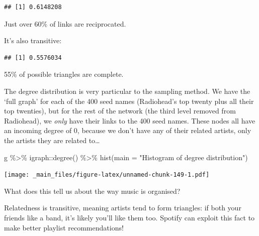 \documentclass[
]{book}
\newenvironment{Shaded}{\begin{snugshade}}{\end{snugshade}}
\newcommand{\AttributeTok}[1]{\textcolor[rgb]{0.77,0.63,0.00}{#1}}
\newcommand{\FunctionTok}[1]{\textcolor[rgb]{0.00,0.00,0.00}{#1}}
\newcommand{\NormalTok}[1]{#1}
\newcommand{\SpecialCharTok}[1]{\textcolor[rgb]{0.00,0.00,0.00}{#1}}
\newcommand{\StringTok}[1]{\textcolor[rgb]{0.31,0.60,0.02}{#1}}
\begin{document}
\begin{verbatim}
## [1] 0.6148208
\end{verbatim}

Just over 60\% of links are reciprocated.

It's also transitive:

\begin{Shaded}
\end{Shaded}

\begin{verbatim}
## [1] 0.5576034
\end{verbatim}

55\% of possible triangles are complete.

The degree distribution is very particular to the sampling method. We have the `full graph' for each of the 400 seed names (Radiohead's top twenty plus all their top twenties), but for the rest of the network (the third level removed from Radiohead), we \emph{only} have their links to the 400 seed names. These nodes all have an incoming degree of 0, because we don't have any of their related artists, only the artists they are related to\ldots{}

\begin{Shaded}
\begin{Highlighting}[]
\NormalTok{g }\SpecialCharTok{\%\textgreater{}\%}\NormalTok{ igraph}\SpecialCharTok{::}\FunctionTok{degree}\NormalTok{() }\SpecialCharTok{\%\textgreater{}\%} \FunctionTok{hist}\NormalTok{(}\AttributeTok{main =} \StringTok{"Histogram of degree distribution"}\NormalTok{)}
\end{Highlighting}
\end{Shaded}

\texttt{[image: \_main\_files/figure-latex/unnamed-chunk-149-1.pdf]}

What does this tell us about the way music is organised?

Relatedness is transitive, meaning artists tend to form triangles: if both your friends like a band, it's likely you'll like them too. Spotify can exploit this fact to make better playlist recommendations!
\end{document}
